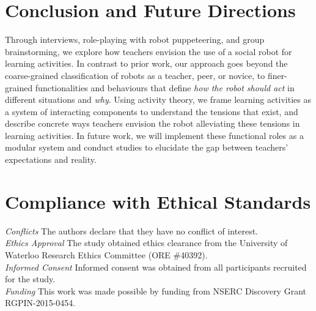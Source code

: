 \section{Conclusion and Future Directions}
\label{sec:22}
Through interviews, role-playing with robot puppeteering, and group brainstorming, we explore how teachers envision the use of a social robot for learning activities. In contrast to prior work, our approach goes beyond the coarse-grained classification of robots as a teacher, peer, or novice, to finer-grained functionalities and behaviours that define {\it how the robot should act} in different situations and \textit{why}. Using activity theory, we frame learning activities as a system of interacting components to understand the tensions that exist, and describe concrete ways teachers envision the robot alleviating these tensions in learning activities. In future work, we will implement these functional roles as a modular system and conduct studies to elucidate the gap between teachers' expectations and reality.

\section*{Compliance with Ethical Standards}
\textit{Conflicts} The authors declare that they have no conflict of interest.\\
\textit{Ethics Approval} The study obtained ethics clearance from the University of Waterloo Research Ethics Committee \newline (ORE \#40392).\\
\textit{Informed Consent} Informed consent was obtained from all participants recruited for the study.\\
\textit{Funding} This work was made possible by funding from \newline NSERC Discovery Grant RGPIN-2015-0454.


      
 





